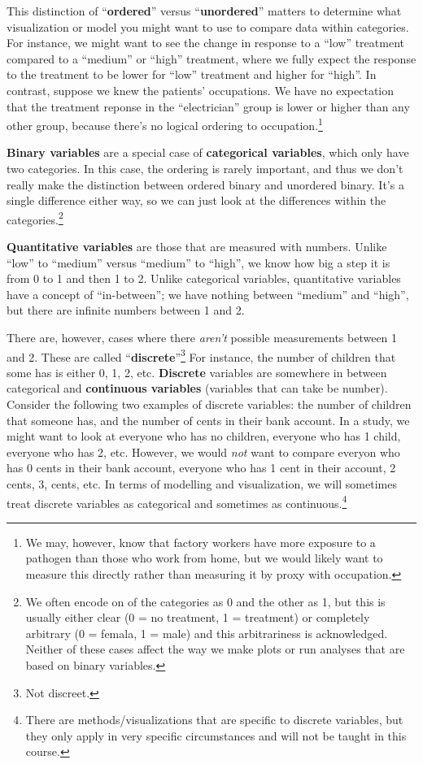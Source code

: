 \documentclass[
  letterpaper,
  DIV=11,
  numbers=noendperiod]{scrreprt}
\begin{document}
This distinction of ``\textbf{ordered}'' versus ``\textbf{unordered}''
matters to determine what visualization or model you might want to use
to compare data within categories. For instance, we might want to see
the change in response to a ``low'' treatment compared to a ``medium''
or ``high'' treatment, where we fully expect the response to the
treatment to be lower for ``low'' treatment and higher for ``high''. In
contrast, suppose we knew the patients' occupations. We have no
expectation that the treatment reponse in the ``electrician'' group is
lower or higher than any other group, because there's no logical
ordering to occupation.\footnote{We may, however, know that factory
  workers have more exposure to a pathogen than those who work from
  home, but we would likely want to measure this directly rather than
  measuring it by proxy with occupation.}

\textbf{Binary variables} are a special case of \textbf{categorical
variables}, which only have two categories. In this case, the ordering
is rarely important, and thus we don't really make the distinction
between ordered binary and unordered binary. It's a single difference
either way, so we can just look at the differences within the
categories.\footnote{We often encode on of the categories as 0 and the
  other as 1, but this is usually either clear (0 = no treatment, 1 =
  treatment) or completely arbitrary (0 = femala, 1 = male) and this
  arbitrariness is acknowledged. Neither of these cases affect the way
  we make plots or run analyses that are based on binary variables.}

\textbf{Quantitative variables} are those that are measured with
numbers. Unlike ``low'' to ``medium'' versus ``medium'' to ``high'', we
know how big a step it is from 0 to 1 and then 1 to 2. Unlike
categorical variables, quantitative variables have a concept of
``in-between''; we have nothing between ``medium'' and ``high'', but
there are infinite numbers between 1 and 2.

There are, however, cases where there \emph{aren't} possible
measurements between 1 and 2. These are called
``\textbf{discrete}''\footnote{Not discreet.} For instance, the number
of children that some has is either 0, 1, 2, etc. \textbf{Discrete}
variables are somewhere in between categorical and \textbf{continuous
variables} (variables that can take be number). Consider the following
two examples of discrete variables: the number of children that someone
has, and the number of cents in their bank account. In a study, we might
want to look at everyone who has no children, everyone who has 1 child,
everyone who has 2, etc. However, we would \emph{not} want to compare
everyon who has 0 cents in their bank account, everyone who has 1 cent
in their account, 2 cents, 3, cents, etc. In terms of modelling and
visualization, we will sometimes treat discrete variables as categorical
and sometimes as continuous.\footnote{There are methods/visualizations
  that are specific to discrete variables, but they only apply in very
  specific circumstances and will not be taught in this course.}
\end{document}
